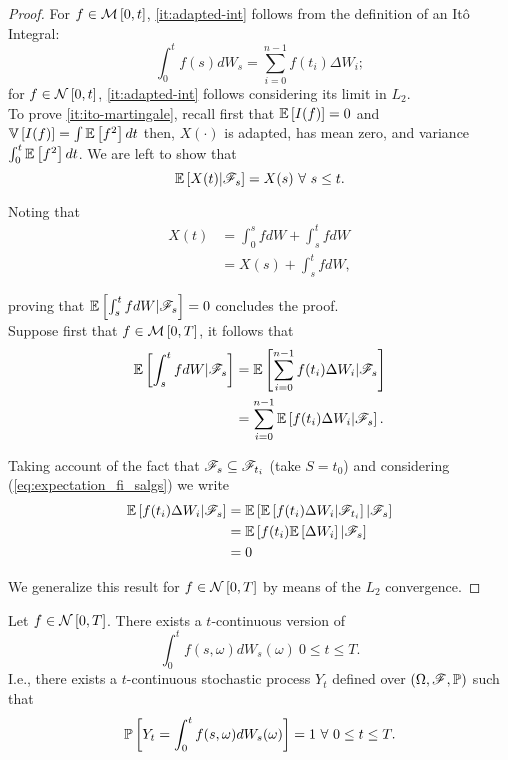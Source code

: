 \documentclass[../TGMAFFIRO.tex]{subfiles}
\begin{document}
\begin{proof}
For $f\in\mathcal{M}\left[0, t\right]$, \ref{it:adapted-int} follows from the definition of an It\^o Integral:
\begin{equation}
  \int_0^t f(s) dW_s = \sum_{i=0}^{n-1} f(t_i) \Delta W_i;
\end{equation}
for $f\in\mathcal{N}\left[0, t\right]$, \ref{it:adapted-int} follows considering its limit in $L_2$.\\

To prove \ref{it:ito-martingale}, recall first that $\mathbb{E}\left[I(f)\right] = 0$ and $\mathbb{V}\left[I(f)\right] = \int\mathbb{E}\left[f^2\right] dt$ then, $X(\cdot)$ is adapted, has mean zero, and variance $\int_0^t\mathbb{E}\left[f^2\right] dt$. We are left to show that
\begin{equation}
  \mathbb{E}\left[X(t) | \mathscr{F}_s\right] = X(s) \ \forall \ s \leq t.
\end{equation}

Noting that
\begin{align}
  X(t) &= \int_0^s f dW + \int_s^t f dW\\
  	&= X(s) + \int_s^t f dW,
\end{align}

proving that $\mathbb{E}\left[\int_s^t f dW | \mathscr{F}_s\right]= 0$ concludes the proof.\\

Suppose first that $f\in\mathcal{M}\left[0, T\right]$, it follows that
\begin{align}
	\mathbb{E}\left[\int_s^t fdW | \mathscr{F}_s\right]  &= \mathbb{E}\left[\sum_{i=0}^{n-1}f(t_i) \Delta W_i | \mathscr{F}_s\right]\nonumber\\
	&= \sum_{i=0}^{n-1}\mathbb{E}\left[f(t_i)\Delta W_i | \mathscr{F}_s\right]\label{eq:expectation_fi_salgs}.
\end{align}

Taking account of the fact that $\mathscr{F}_s \subseteq \mathscr{F}_{t_i}$ (take $S=t_0$) and considering (\ref{eq:expectation_fi_salgs}) we write
\begin{align}
  \mathbb{E}\left[f(t_i)\Delta W_i | \mathscr{F}_s\right] &= \mathbb{E}\left[\mathbb{E}\left[f(t_i)\Delta W_i | \mathscr{F}_{t_i}\right]| \mathscr{F}_s\right]\\
  &=\mathbb{E}\left[f(t_i)\mathbb{E}\left[\Delta W_i\right]| \mathscr{F}_s\right]\\
  &= 0
\end{align}

We generalize this result for $f\in\mathcal{N}\left[0, T\right]$ by means of the $L_2$ convergence.
\end{proof}


\begin{theorem}
	Let $f\in\mathcal{N}\left[0, T\right]$. There exists a $t$-continuous version of
	\begin{equation}
		\int_0^t f(s,\omega) dW_s(\omega) \ 0\leq t \leq T.
	\end{equation}
I.e., there exists a $t$-continuous stochastic process $Y_t$ defined over $(\Omega, \mathscr{F}, \mathbb{P})$ such that
\begin{equation}
	\mathbb{P}\left[Y_t = \int_0^tf(s,\omega) dW_s(\omega)\right] = 1 \ \forall \ 0\leq t \leq T.
\end{equation}
\end{theorem}
\end{document}
